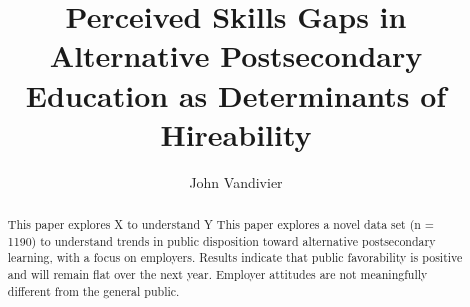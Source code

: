 \documentclass[review]{elsarticle}
\begin{document}
\begin{frontmatter}

    \title{
        Perceived Skills Gaps in Alternative Postsecondary Education as Determinants of Hireability
    }

    \author[mymainaddress]{John Vandivier}
    \address[mymainaddress]{4400 University Dr, Fairfax, VA 22030}

    \begin{abstract}
        This paper explores X to understand Y
        This paper explores a novel data set (n = 1190) to understand trends in public
        disposition toward alternative postsecondary learning, with a focus on employers.
        Results indicate that public favorability is positive and will remain flat over the next year.
        Employer attitudes are not meaningfully different from the general public.



\end{abstract}
\end{frontmatter}
\end{document}
